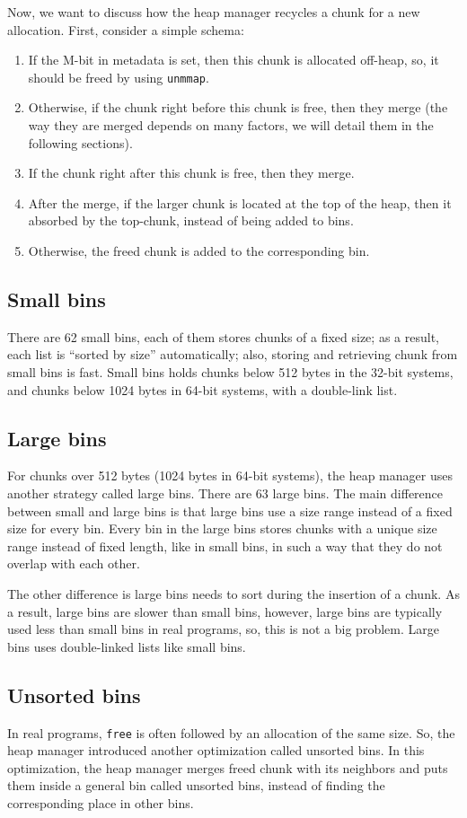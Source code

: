 \documentclass{masterthesis}
\newcommand*\ub{unsorted bins}
\newcommand*\lb{large bins}
\newcommand*\sbs{small bins}
\newcommand*\Ub{Unsorted bins\xspace}
\newcommand*\Lb{Large bins\xspace}
\newcommand*\Sbs{Small bins\xspace}
\begin{document}
Now, we want to discuss how the heap manager recycles a chunk for a new allocation. First, consider a simple schema:
\begin{enumerate}
	\item If the M-bit in metadata is set, then this chunk is allocated off-heap, so, it should be freed by using \lstinline{unmmap}.
	\item Otherwise, if the chunk right before this chunk is free, then they merge (the way they are merged depends on many factors, we will detail them in the following sections).
	\item If the chunk right after this chunk is free, then they merge.
	\item After the merge, if the larger chunk is located at the top of the heap, then it absorbed by the top-chunk, instead of being added to bins.
	\item Otherwise, the freed chunk is added to the corresponding bin.
\end{enumerate}

\subsection{\Sbs}
There are 62 \sbs{}, each of them stores chunks of a fixed size; as a result, each list is ``sorted by size'' automatically; also, storing and retrieving chunk from \sbs{} is fast. \Sbs{} holds chunks below 512 bytes in the 32-bit systems, and chunks below 1024 bytes in 64-bit systems, with a double-link list.

\subsection{\Lb}
For chunks over 512 bytes (1024 bytes in 64-bit systems), the heap manager uses another strategy called \lb{}. There are 63 \lb{}. The main difference between small and \lb{} is that \lb{} use a size range instead of a fixed size for every bin. Every bin in the \lb{} stores chunks with a unique size range instead of fixed length, like in \sbs{}, in such a way that they do not overlap with each other.

The other difference is \lb{} needs to sort during the insertion of a chunk. As a result, \lb{} are slower than \sbs{}, however, \lb{} are typically used less than \sbs{} in real programs, so, this is not a big problem. \Lb{} uses double-linked lists like \sbs{}.

\subsection{\Ub}
In real programs, \lstinline{free} is often followed by an allocation of the same size. So, the heap manager introduced another optimization called \ub{}. In this optimization, the heap manager merges freed chunk with its neighbors and puts them inside a general bin called \ub{}, instead of finding the corresponding place in other bins.
\end{document}
